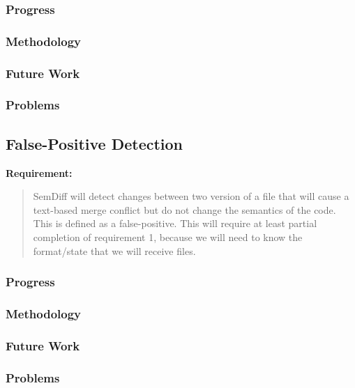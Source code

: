 \documentclass[draftclsnofoot,onecolumn]{IEEEtran}
\begin{document}
\subsubsection{Progress}

\subsubsection{Methodology}

\subsubsection{Future Work}

\subsubsection{Problems}






\subsection{False-Positive Detection}

\textbf{Requirement:}

\begin{quote}

SemDiff will detect changes between two version of a file that will cause a text-based merge conflict but do not change the semantics of the code. This is defined as a false-positive. This will require at least partial completion of requirement 1, because we will need to know the format/state that we will receive files.

\end{quote}

\subsubsection{Progress}

\subsubsection{Methodology}

\subsubsection{Future Work}

\subsubsection{Problems}
\end{document}
